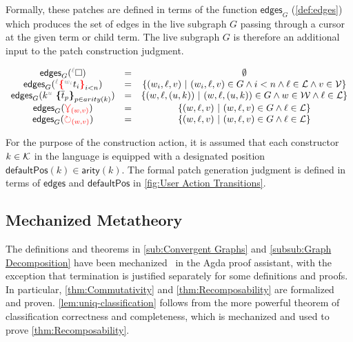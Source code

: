 Formally, these patches are defined in terms of the function $\mathsf{edges}_G$ (\autoref{def:edges}) which produces the set of edges in the live subgraph $G$ passing through a cursor at the given term or child term. The live subgraph $G$ is therefore an additional input to the patch construction judgment.

\begin{definition}
\label{def:edges}
    \[
    \begin{array}{ccc}
    \mathsf{edges}_G(\ehole) & = & \emptyset\\
    \mathsf{edges}_G(\conflict{\termMV}) & = & \SetOf{(w_i,\ell,v)\SuchThat{(w_i,\ell,v)\in G\land i<n\land \ell\in\L\land v\in\V}}\\
    \mathsf{edges}_G(\genericTerm{u}{\subtermMV_p}) & = & \SetOf{(w,\ell,(u,k))\SuchThat{(w,\ell,(u,k))\in G\land w\in\W\land \ell\in\L}}\\
    \mathsf{edges}_G(\multiref) & = & \SetOf{(w,\ell,v)\SuchThat{(w,\ell,v)\in G\land\ell\in\L}}\\
    \mathsf{edges}_G(\uniref) & = & \SetOf{(w,\ell,v)\SuchThat{(w,\ell,v)\in G\land\ell\in\L}}\\
    \end{array}
\]
\end{definition}

For the purpose of the construction action, it is assumed that each constructor $k\in\mathcal{K}$ in the language is equipped with a designated position $\mathsf{defaultPos}(k)\in \mathsf{arity}(k)$. The formal patch generation judgment is defined in terms of $\mathsf{edges}$ and $\mathsf{defaultPos}$ in \autoref{fig:User Action Transitions}.

\figureUserActionTransitions

\subsection{Mechanized Metatheory}
\label{sec:formalism-agda}

The definitions and theorems in \autoref{sub:Convergent Graphs} and \autoref{subsub:Graph Decomposition} have been mechanized~\cite{grove-artifact} in the Agda proof assistant, with the exception that termination is justified separately for some definitions and proofs. In particular, \autoref{thm:Commutativity} and \autoref{thm:Recomposability} are formalized and proven. \autoref{lem:uniq-classification} follows from the more powerful theorem of classification correctness and completeness, which is mechanized and used to prove \autoref{thm:Recomposability}.


